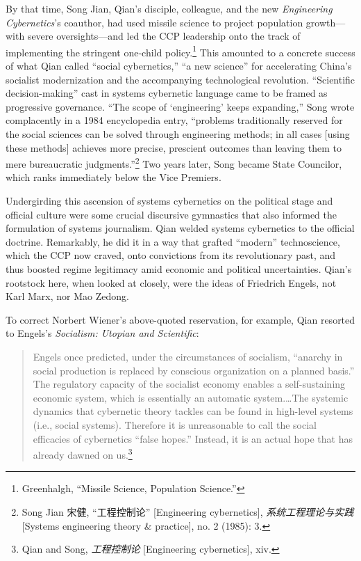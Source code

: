 \documentclass{tufte-handout}
\begin{document}
\begin{CJK*}{UTF8}{gbsn}
By that time, Song Jian, Qian's disciple, colleague, and the new
\emph{Engineering Cybernetics}'s coauthor, had used missile science to
project population growth---with severe oversights---and led the CCP
leadership onto the track of implementing the stringent one-child
policy.\footnote{Greenhalgh, ``Missile Science, Population Science.''}
This amounted to a concrete success of what Qian called ``social
cybernetics,'' ``a new science'' for accelerating China's socialist
modernization and the accompanying technological revolution.
``Scientific decision-making'' cast in systems cybernetic language came
to be framed as progressive governance. ``The scope of `engineering'
keeps expanding,'' Song wrote complacently in a 1984 encyclopedia entry,
``problems traditionally reserved for the social sciences can be solved
through engineering methods; in all cases {[}using these methods{]}
achieves more precise, prescient outcomes than leaving them to mere
bureaucratic judgments.''\footnote{Song Jian 宋健, ``工程控制论''
  {[}Engineering cybernetics{]}, \emph{系统工程理论与实践} {[}Systems
  engineering theory \& practice{]}, no. 2 (1985): 3.} Two years later,
Song became State Councilor, which ranks immediately below the Vice
Premiers.

Undergirding this ascension of systems cybernetics on the political
stage and official culture were some crucial discursive gymnastics that
also informed the formulation of systems journalism. Qian welded systems
cybernetics to the official doctrine. Remarkably, he did it in a way
that grafted ``modern'' technoscience, which the CCP now craved, onto
convictions from its revolutionary past, and thus boosted regime
legitimacy amid economic and political uncertainties. Qian's rootstock
here, when looked at closely, were the ideas of Friedrich Engels, not
Karl Marx, nor Mao Zedong.

To correct Norbert Wiener's above-quoted reservation, for example, Qian
resorted to Engels's \emph{Socialism: Utopian and Scientific}:

\begin{quote}
Engels once predicted, under the circumstances of socialism, ``anarchy
in social production is replaced by conscious organization on a planned
basis.'' The regulatory capacity of the socialist economy enables a
self-sustaining economic system, which is essentially an automatic
system.\ldots The systemic dynamics that cybernetic theory tackles can
be found in high-level systems (i.e., social systems). Therefore it is
unreasonable to call the social efficacies of cybernetics ``false
hopes.'' Instead, it is an actual hope that has already dawned on
us.\footnote{Qian and Song, \emph{工程控制论} {[}Engineering
  cybernetics{]}, xiv.}
\end{quote}


\end{CJK*}
\end{document}
